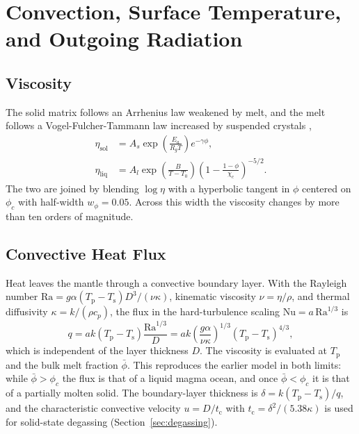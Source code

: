 \documentclass[11pt]{article}
\newcommand{\Tp}{T_\mathrm{p}}
\newcommand{\Ts}{T_\mathrm{s}}
\begin{document}
\section{Convection, Surface Temperature, and Outgoing Radiation}\label{sec:surface}

\subsection{Viscosity}

The solid matrix follows an Arrhenius law weakened by melt, and the melt follows a Vogel-Fulcher-Tammann law increased by suspended crystals \citep{Roscoe1952,Lebrun2013},
\begin{align}
\eta_\mathrm{sol} &= A_s \exp\left(\frac{E_a}{R_g T}\right) e^{-\gamma \phi}, \\
\eta_\mathrm{liq} &= A_l \exp\left(\frac{B}{T - T_0}\right) \left(1 - \frac{1 - \phi}{\chi_c}\right)^{-5/2}.
\end{align}
The two are joined by blending $\log \eta$ with a hyperbolic tangent in $\phi$ centered on $\phi_c$ with half-width $w_\phi = 0.05$. Across this width the viscosity changes by more than ten orders of magnitude.

\subsection{Convective Heat Flux}

Heat leaves the mantle through a convective boundary layer. With the Rayleigh number $\mathrm{Ra} = g \alpha (\Tp - \Ts) D^3 / (\nu \kappa)$, kinematic viscosity $\nu = \eta / \rho$, and thermal diffusivity $\kappa = k / (\rho c_p)$, the flux in the hard-turbulence scaling $\mathrm{Nu} = a \, \mathrm{Ra}^{1/3}$ is
\begin{equation}
q = a k (\Tp - \Ts) \frac{\mathrm{Ra}^{1/3}}{D}
= a k \left( \frac{g \alpha}{\nu \kappa} \right)^{1/3} (\Tp - \Ts)^{4/3},
\label{eq:heatflux}
\end{equation}
which is independent of the layer thickness $D$. The viscosity is evaluated at $\Tp$ and the bulk melt fraction $\bar{\phi}$. This reproduces the earlier model in both limits: while $\bar{\phi} > \phi_c$ the flux is that of a liquid magma ocean, and once $\bar{\phi} < \phi_c$ it is that of a partially molten solid. The boundary-layer thickness is $\delta = k (\Tp - \Ts) / q$, and the characteristic convective velocity $u = D / t_\mathrm{c}$ with $t_\mathrm{c} = \delta^2 / (5.38 \kappa)$ is used for solid-state degassing (Section~\ref{sec:degassing}).
\end{document}
